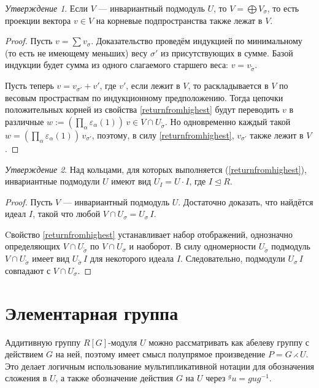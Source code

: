 \documentclass[10pt]{article}
\theoremstyle{remark}
\newtheorem{prop}{Утверждение}
\begin{document}
\begin{prop}\label{weightprojections}
Если $V$ --- инвариантный подмодуль $U$, то $V = \bigoplus V_\sigma$, то есть проекции вектора $v \in V$ на корневые подпространства также лежат в $V$.
\end{prop}
\begin{proof}
Пусть $v = \sum v_\sigma$. Доказательство проведём индукцией по минимальному (то есть не имеющему меньших) весу $\sigma'$ из присутствующих в сумме. Базой индукции будет сумма из одного слагаемого старшего веса: $v = v_{\widetilde\sigma}$.

Пусть теперь $v = v_{\sigma'} + v'$, где $v'$, если лежит в $V$, то раскладывается в $V$ по весовым простраствам по индукционному предположению. Тогда цепочки положительных корней из свойства \ref{returnfromhighest} будут переводить $v$ в различные $w := \left(\prod_{\alpha}\varepsilon_\alpha(1)\right) \, v \in V \cap U_{\widetilde\sigma}$. Но одновременно каждый такой $w = \left(\prod_{\alpha}\varepsilon_\alpha(1)\right) \, v_{\sigma'}$, поэтому, в силу \ref{returnfromhighest}, $v_{\sigma'}$ также лежит в $V$.
\end{proof}

\begin{prop}\label{unipotentsubgroups}
Над кольцами, для которых выполняется (\ref{returnfromhighest}), инвариантные подмодули $U$ имеют вид $U_I = U \cdot I$, где $I \trianglelefteq R$.
\end{prop}
\begin{proof}
Пусть $V$ --- инвариантный подмодуль $U$. Достаточно доказать, что найдётся идеал $I$, такой что любой $V \cap U_\sigma = U_\sigma \, I$.

Cвойство \ref{returnfromhighest} устанавливает набор отображений, однозначно определяющих $V \cap U_{\widetilde\sigma}$ по $V \cap U_\sigma$ и наоборот. В силу одномерности $U_{\widetilde\sigma}$ подмодуль $V \cap U_{\widetilde\sigma}$ имеет вид $U_{\widetilde\sigma} \, I$ для некоторого идеала $I$. Следовательно, подмодули $U_{\sigma} \, I$ совпадают с $V \cap U_\sigma$.
\end{proof}


\section{Элементарная группа}

Аддитивную группу $R[G]$-модуля $U$ можно рассматривать как абелеву группу с действием $G$ на ней, поэтому
имеет смысл полупрямое произведение $P = G \rightthreetimes U$.
Это делает логичным использование мультипликативной нотации для обозначения сложения в $U$, а также обозначение действия $G$ на $U$ через $^{g}u = g u g^{-1}$. 
\end{document}
